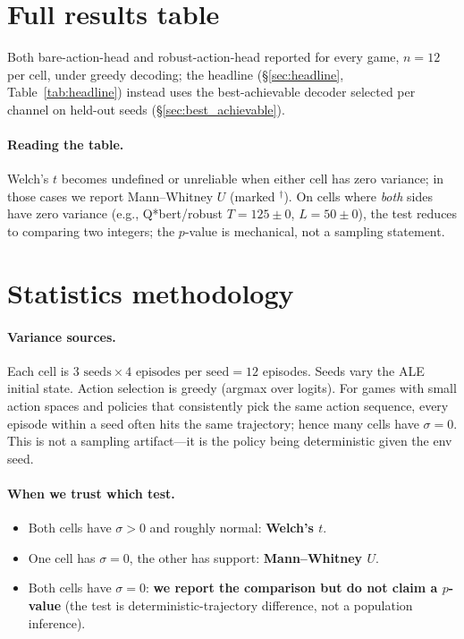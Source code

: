 \documentclass[11pt]{article}
\begin{document}



\appendix
\section{Full results table}
\label{app:full}

Both bare-action-head and robust-action-head reported for every game, $n=12$ per cell, under greedy
decoding; the headline (\S\ref{sec:headline}, Table~\ref{tab:headline}) instead uses the
best-achievable decoder selected per channel on held-out seeds (\S\ref{sec:best_achievable}).

\smallskip\noindent

\smallskip

\paragraph{Reading the table.} Welch's $t$ becomes undefined or unreliable when either cell has zero variance; in those cases we report Mann--Whitney $U$ (marked $^{\dagger}$). On cells where \emph{both} sides have zero variance (e.g., Q*bert/robust $T=125\!\pm\!0$, $L=50\!\pm\!0$), the test reduces to comparing two integers; the $p$-value is mechanical, not a sampling statement.

\section{Statistics methodology}
\label{app:stats}

\paragraph{Variance sources.} Each cell is $3 \text{ seeds} \times 4 \text{ episodes per seed} = 12$ episodes. Seeds vary the ALE initial state. Action selection is greedy (argmax over logits). For games with small action spaces and policies that consistently pick the same action sequence, every episode within a seed often hits the same trajectory; hence many cells have $\sigma=0$. This is not a sampling artifact---it is the policy being deterministic given the env seed.

\paragraph{When we trust which test.}
\begin{itemize}[topsep=0pt,itemsep=0pt,leftmargin=*]
\item Both cells have $\sigma>0$ and roughly normal: \textbf{Welch's $t$}.
\item One cell has $\sigma=0$, the other has support: \textbf{Mann--Whitney $U$}.
\item Both cells have $\sigma=0$: \textbf{we report the comparison but do not claim a $p$-value} (the test is deterministic-trajectory difference, not a population inference).
\end{itemize}
\end{document}
